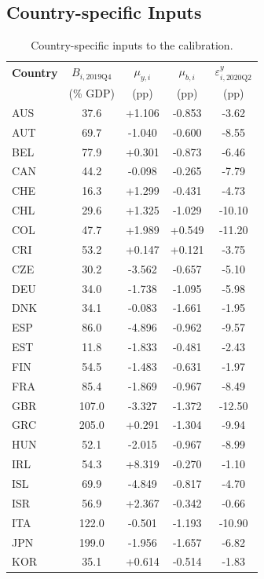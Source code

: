 \documentclass[12pt, a4paper]{article}
\begin{document}
\subsection{Country-specific Inputs}

\begin{table}[H]
\centering
\caption{Country-specific inputs to the calibration.}
\label{tab:country_inputs}
\scriptsize
\begin{tabular}{lcccc}
\toprule
\textbf{Country} & $B_{i,2019\text{Q}4}$ & $\mu_{y,i}$ & $\mu_{b,i}$ & $\varepsilon^{y}_{i,2020\text{Q}2}$ \\
 & (\% GDP) & (pp) & (pp) & (pp) \\
\midrule
AUS & 37.6 & +1.106 & -0.853 & -3.62 \\
AUT & 69.7 & -1.040 & -0.600 & -8.55 \\
BEL & 77.9 & +0.301 & -0.873 & -6.46 \\
CAN & 44.2 & -0.098 & -0.265 & -7.79 \\
CHE & 16.3 & +1.299 & -0.431 & -4.73 \\
CHL & 29.6 & +1.325 & -1.029 & -10.10 \\
COL & 47.7 & +1.989 & +0.549 & -11.20 \\
CRI & 53.2 & +0.147 & +0.121 & -3.75 \\
CZE & 30.2 & -3.562 & -0.657 & -5.10 \\
DEU & 34.0 & -1.738 & -1.095 & -5.98 \\
DNK & 34.1 & -0.083 & -1.661 & -1.95 \\
ESP & 86.0 & -4.896 & -0.962 & -9.57 \\
EST & 11.8 & -1.833 & -0.481 & -2.43 \\
FIN & 54.5 & -1.483 & -0.631 & -1.97 \\
FRA & 85.4 & -1.869 & -0.967 & -8.49 \\
GBR & 107.0 & -3.327 & -1.372 & -12.50 \\
GRC & 205.0 & +0.291 & -1.304 & -9.94 \\
HUN & 52.1 & -2.015 & -0.967 & -8.99 \\
IRL & 54.3 & +8.319 & -0.270 & -1.10 \\
ISL & 69.9 & -4.849 & -0.817 & -4.70 \\
ISR & 56.9 & +2.367 & -0.342 & -0.66 \\
ITA & 122.0 & -0.501 & -1.193 & -10.90 \\
JPN & 199.0 & -1.956 & -1.657 & -6.82 \\
KOR & 35.1 & +0.614 & -0.514 & -1.83 \\

\end{tabular}
\end{table}
\end{document}
